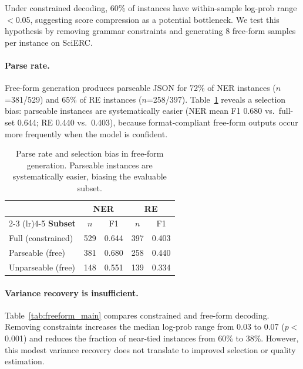 \documentclass[11pt,a4paper]{article}
\begin{document}
Under constrained decoding, 60\% of instances have within-sample log-prob range $<$0.05, suggesting score compression as a potential bottleneck. We test this hypothesis by removing grammar constraints and generating 8 free-form samples per instance on SciERC.

\paragraph{Parse rate.} Free-form generation produces parseable JSON for 72\% of NER instances ($n$=381/529) and 65\% of RE instances ($n$=258/397). Table~\ref{tab:parse_bias} reveals a selection bias: parseable instances are systematically easier (NER mean F1 0.680 vs.\ full-set 0.644; RE 0.440 vs.\ 0.403), because format-compliant free-form outputs occur more frequently when the model is confident.

\begin{table}[t]
\centering
\small
\begin{tabular}{l cc cc}
\toprule
& \multicolumn{2}{c}{\textbf{NER}} & \multicolumn{2}{c}{\textbf{RE}} \\
\cmidrule(lr){2-3} \cmidrule(lr){4-5}
\textbf{Subset} & $n$ & F1 & $n$ & F1 \\
\midrule
Full (constrained) & 529 & 0.644 & 397 & 0.403 \\
Parseable (free)   & 381 & 0.680 & 258 & 0.440 \\
Unparseable (free) & 148 & 0.551 & 139 & 0.334 \\
\bottomrule
\end{tabular}
\caption{Parse rate and selection bias in free-form generation. Parseable instances are systematically easier, biasing the evaluable subset.}
\label{tab:parse_bias}
\end{table}

\paragraph{Variance recovery is insufficient.} Table~\ref{tab:freeform_main} compares constrained and free-form decoding. Removing constraints increases the median log-prob range from 0.03 to 0.07 ($p$$<$0.001) and reduces the fraction of near-tied instances from 60\% to 38\%. However, this modest variance recovery does not translate to improved selection or quality estimation.
\end{document}
